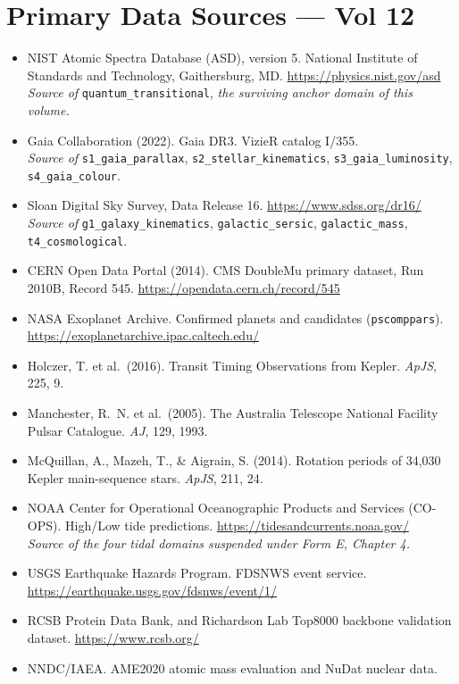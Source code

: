 \documentclass[11pt, letterpaper, openany]{book}
\begin{document}
\section*{Primary Data Sources --- Vol 12}

\begin{itemize}
    \item NIST Atomic Spectra Database (ASD), version 5.
          National Institute of Standards and Technology, Gaithersburg, MD.
          \url{https://physics.nist.gov/asd}
          \\ \textit{Source of} \texttt{quantum\_transitional}, \textit{the surviving anchor
          domain of this volume.}
    \item Gaia Collaboration (2022). Gaia DR3. VizieR catalog I/355.
          \\ \textit{Source of} \texttt{s1\_gaia\_parallax}, \texttt{s2\_stellar\_kinematics},
          \texttt{s3\_gaia\_luminosity}, \texttt{s4\_gaia\_colour}.
    \item Sloan Digital Sky Survey, Data Release 16. \url{https://www.sdss.org/dr16/}
          \\ \textit{Source of} \texttt{g1\_galaxy\_kinematics}, \texttt{galactic\_sersic},
          \texttt{galactic\_mass}, \texttt{t4\_cosmological}.
    \item CERN Open Data Portal (2014). CMS DoubleMu primary dataset, Run 2010B, Record 545.
          \url{https://opendata.cern.ch/record/545}
    \item NASA Exoplanet Archive. Confirmed planets and candidates (\texttt{pscomppars}).
          \url{https://exoplanetarchive.ipac.caltech.edu/}
    \item Holczer, T. et al.\ (2016). Transit Timing Observations from Kepler.
          \textit{ApJS}, 225, 9.
    \item Manchester, R.~N. et al.\ (2005). The Australia Telescope National Facility Pulsar
          Catalogue. \textit{AJ}, 129, 1993.
    \item McQuillan, A., Mazeh, T., \& Aigrain, S. (2014). Rotation periods of 34,030
          Kepler main-sequence stars. \textit{ApJS}, 211, 24.
    \item NOAA Center for Operational Oceanographic Products and Services (CO-OPS).
          High/Low tide predictions. \url{https://tidesandcurrents.noaa.gov/}
          \\ \textit{Source of the four tidal domains suspended under Form E, Chapter 4.}
    \item USGS Earthquake Hazards Program. FDSNWS event service.
          \url{https://earthquake.usgs.gov/fdsnws/event/1/}
    \item RCSB Protein Data Bank, and Richardson Lab Top8000 backbone validation dataset.
          \url{https://www.rcsb.org/}
    \item NNDC/IAEA. AME2020 atomic mass evaluation and NuDat nuclear data.
\end{itemize}
\end{document}
